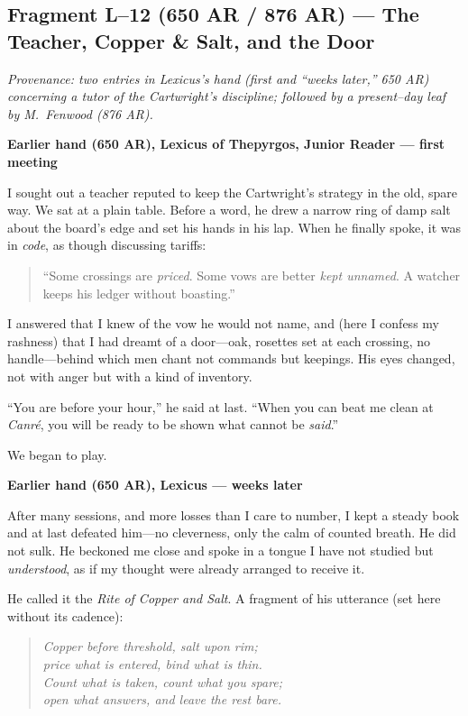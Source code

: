 \documentclass[11pt]{article}
\begin{document}
\subsection{Fragment L--12 (650 AR / 876 AR) — The Teacher, Copper \& Salt, and the Door}
\label{frag:l12}

\noindent\textit{Provenance: two entries in Lexicus’s hand (first and “weeks later,” 650 AR) concerning a tutor of the Cartwright’s discipline; followed by a present–day leaf by M.\ Fenwood (876 AR).}

\medskip
\noindent\textbf{Earlier hand (650 AR), Lexicus of Thepyrgos, Junior Reader — first meeting}

I sought out a teacher reputed to keep the Cartwright’s strategy in the old, spare way. We sat at a plain table. Before a word, he drew a narrow ring of damp salt about the board’s edge and set his hands in his lap. When he finally spoke, it was in \emph{code}, as though discussing tariffs:

\begin{quote}\small
“Some crossings are \emph{priced}. Some vows are better \emph{kept unnamed}. A watcher keeps his ledger without boasting.”
\end{quote}

I answered that I knew of the vow he would not name, and (here I confess my rashness) that I had dreamt of a door—oak, rosettes set at each crossing, no handle—behind which men chant not commands but keepings. His eyes changed, not with anger but with a kind of inventory.

“You are before your hour,” he said at last. “When you can beat me clean at \textit{Canr\'e}, you will be ready to be shown what cannot be \emph{said}.”

We began to play.

\medskip
\noindent\textbf{Earlier hand (650 AR), Lexicus — weeks later}

After many sessions, and more losses than I care to number, I kept a steady book and at last defeated him—no cleverness, only the calm of counted breath. He did not sulk. He beckoned me close and spoke in a tongue I have not studied but \emph{understood}, as if my thought were already arranged to receive it.

He called it the \textit{Rite of Copper and Salt}. A fragment of his utterance (set here without its cadence):

\begin{quote}\small
\textit{Copper before threshold, salt upon rim;\\
price what is entered, bind what is thin.\\
Count what is taken, count what you spare;\\
open what answers, and leave the rest bare.}
\end{quote}
\end{document}
